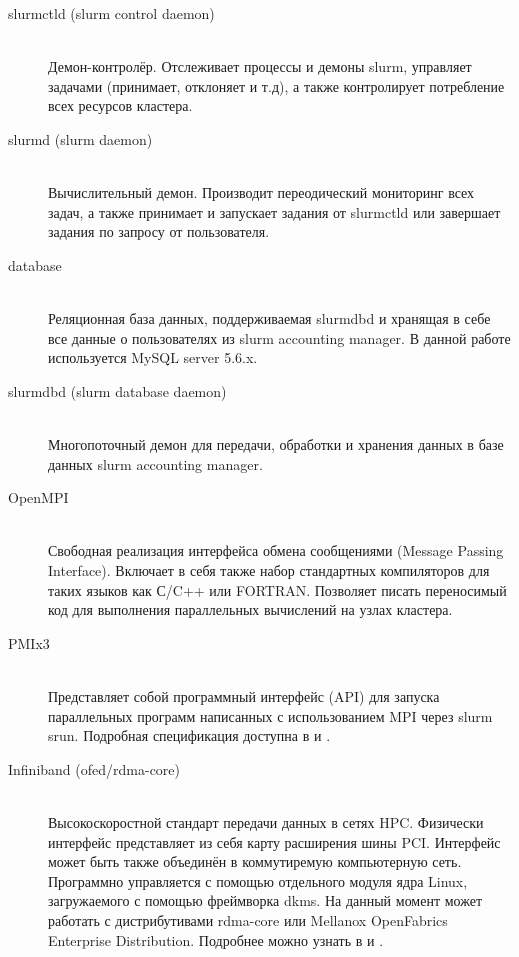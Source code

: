 \documentclass[a4paper]{extarticle}
\begin{document}
\begin{description}
  \item[slurmctld (slurm control daemon)] \hfill \\ Демон-контролёр. Отслеживает процессы и демоны slurm,  управляет задачами (принимает, отклоняет и т.д), а также контролирует потребление всех ресурсов кластера.

  \item[slurmd (slurm daemon)] \hfill \\ Вычислительный демон. Производит переодический мониторинг всех задач, а также принимает и запускает задания от slurmctld или завершает задания по запросу от пользователя.

  \item[database] \hfill \\ Реляционная база данных, поддерживаемая slurmdbd и хранящая в себе все данные о пользователях из slurm accounting manager. В данной работе используется MySQL
server 5.6.x.

  \item[slurmdbd (slurm database daemon)] \hfill \\ Многопоточный демон для передачи, обработки и хранения данных в базе данных slurm accounting manager.

  \item[OpenMPI] \hfill \\ Свободная реализация интерфейса обмена сообщениями (Message Passing Interface). Включает в себя также набор стандартных компиляторов для таких языков как С/C++ или FORTRAN. Позволяет писать переносимый код для выполнения параллельных вычислений на узлах кластера.

  \item[PMIx3] \hfill \\  Представляет собой программный интерфейс (API) для запуска параллельных программ написанных с использованием MPI через slurm srun. Подробная спецификация доступна в \cite{slurm-pmix} и \cite{slurm-mpi}.

  \item[Infiniband (ofed/rdma-core)] \hfill \\ Высокоскоростной стандарт передачи данных в сетях HPC. Физически интерфейс представляет из себя карту расширения шины PCI. Интерфейс может быть также объединён в коммутиремую компьютерную сеть. Программно управляется с помощью отдельного модуля ядра Linux, загружаемого с помощью фреймворка dkms. На данный момент может работать с дистрибутивами rdma-core или Mellanox OpenFabrics Enterprise Distribution. Подробнее можно узнать в \cite{mpi-over-ib} и \cite{intel-ib}.


\end{description}
\end{document}
